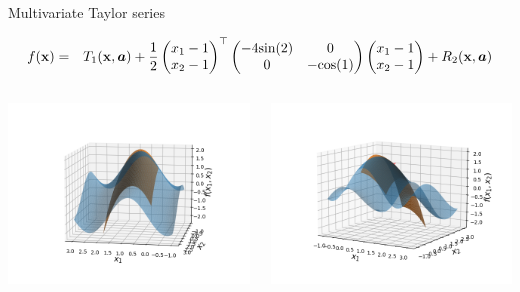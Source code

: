 \begin{vbframe}{Multivariate Taylor series}
\begin{footnotesize}
  \begin{eqnarray*}
    f(\mathbf{x}) &=& T_1(\mathbf{x}, \bm{a}) + \frac{1}{2}\begin{pmatrix}x_1 - 1 \\ x_2 - 1 \end{pmatrix}^\top \begin{pmatrix} -4 \text{sin}(2) & 0 \\ 0 & -\text{cos}(1) \end{pmatrix} \begin{pmatrix}x_1 - 1 \\ x_2 - 1 \end{pmatrix} + R_2(\mathbf{x}, \bm{a})
  \end{eqnarray*}
  \vspace*{-0.2cm}
  \end{footnotesize}
  \begin{columns}
    \begin{column}{0.3\textwidth}
      \includegraphics[width = \textwidth]{figure_man/Taylor2D/Taylor2D_2nd-100.png}
    \end{column}
    \begin{column}{0.3\textwidth}
      \includegraphics[width = \textwidth]{figure_man/Taylor2D/Taylor2D_2nd-301.png}

\end{column}
\end{columns}
\end{vbframe}
